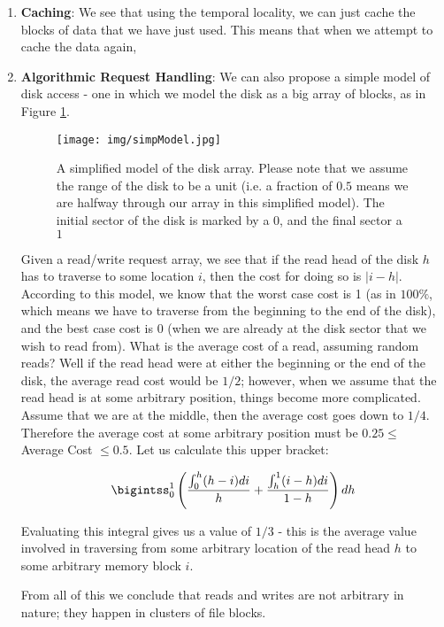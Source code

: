 \documentclass[a4paper]{article}
\begin{document}
\begin{enumerate}
\item \textbf{Caching}: We see that using the temporal locality, we can just cache the blocks of data that we have just used. This means that when we attempt to cache the data again, 
\item \textbf{Algorithmic Request Handling}: We can also propose a simple model of disk access - one in which we model the disk as a big array of blocks, as in Figure \ref{fig:SimpModel}. 

\begin{figure}
\centering
\texttt{[image: img/simpModel.jpg]}
\caption{\label{fig:SimpModel}A simplified model of the disk array. Please note that we assume the range of the disk to be a unit (i.e. a fraction of $0.5$ means we are halfway through our array in this simplified model). The initial sector of the disk is marked by a $0$, and the final sector a $1$}
\end{figure}

Given a read/write request array, we see that if the read head of the disk $h$ has to traverse to some location $i$, then the cost for doing so is $|i-h|$. According to this model, we know that the worst case cost is 1 (as in $100\%$, which means we have to traverse from the beginning to the end of the disk), and the best case cost is $0$ (when we are already at the disk sector that we wish to read from). What is the average cost of a read, assuming random reads? Well if the read head were at either the beginning or the end of the disk, the average read cost would be $1/2$; however, when we assume that the read head is at some arbitrary position, things become more complicated. Assume that we are at the middle, then the average cost goes down to $1/4$. Therefore the average cost at some arbitrary position must be $0.25\leq$ Average Cost $\leq 0.5$. Let us calculate this upper bracket:

\begin{align*}
\bigintss_0^1 \left( \dfrac{\int_0^h (h-i)di}{h} + \dfrac{\int_h^1 (i-h)di}{1-h} \right) dh
\end{align*}

Evaluating this integral gives us a value of $1/3$ - this is the average value involved in traversing from some arbitrary location of the read head $h$ to some arbitrary memory block $i$. 

From all of this we conclude that reads and writes are not arbitrary in nature; they happen in clusters of file blocks.


\end{enumerate}
\end{document}
